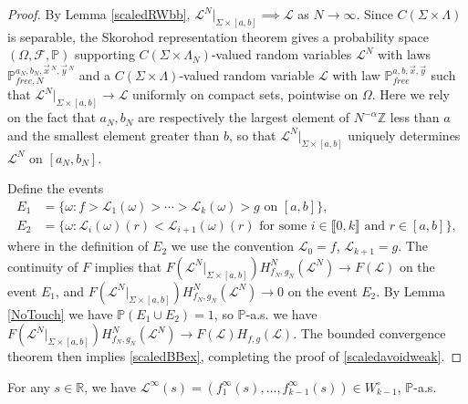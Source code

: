 \begin{proof}
	By Lemma \ref{scaledRWbb}, $\mathcal{L}^N|_{\Sigma\times[a,b]} \implies \mathcal{L}$ as $N\to\infty$. Since $C(\Sigma\times\Lambda)$ is separable, the Skorohod representation theorem \cite[Theorem 6.7]{Billing} gives a probability space $(\Omega,\mathcal{F},\mathbb{P})$ supporting $C(\Sigma\times\Lambda_N)$-valued random variables $\mathcal{L}^N$ with laws $\mathbb{P}^{a_N,b_N,\vec{x}\,^N,\vec{y}\,^N}_{free,N}$ and a $C(\Sigma\times\Lambda)$-valued random variable $\mathcal{L}$ with law $\mathbb{P}^{a,b,\vec{x},\vec{y}}_{free}$ such that $\mathcal{L}^N|_{\Sigma\times[a,b]}\to\mathcal{L}$ uniformly on compact sets, pointwise on $\Omega$. Here we rely on the fact that $a_N,b_N$ are respectively the largest element of $N^{-\alpha}\mathbb{Z}$ less than $a$ and the smallest element greater than $b$, so that $\mathcal{L}^N|_{\Sigma\times[a,b]}$ uniquely determines $\mathcal{L}^N$ on $[a_N,b_N]$.
	
	Define the events
	\begin{align*}
	E_1 &= \{\omega : f > \mathcal{L}_1(\omega) > \cdots > \mathcal{L}_k(\omega) > g \mbox{ on } [a,b]\},\\
	E_2 &= \{\omega : \mathcal{L}_i(\omega)(r) < \mathcal{L}_{i+1}(\omega)(r) \mbox{ for some } i\in\llbracket 0,k\rrbracket \mbox{ and } r\in[a,b]\},
	\end{align*}
	where in the definition of $E_2$ we use the convention $\mathcal{L}_0 = f$, $\mathcal{L}_{k+1} = g$. The continuity of $F$ implies that $F(\mathcal{L}^N|_{\Sigma\times[a,b]})H^N_{f_N,g_N}(\mathcal{L}^N) \to F(\mathcal{L})$ on the event $E_1$, and $F(\mathcal{L}^N|_{\Sigma\times[a,b]})H^N_{f_N,g_N}(\mathcal{L}^N)\to 0$ on the event $E_2$. By Lemma \ref{NoTouch} we have $\mathbb{P}(E_1 \cup E_2) = 1$, so $\mathbb{P}$-a.s. we have $F(\mathcal{L}^N|_{\Sigma\times[a,b]})H^N_{f_N,g_N}(\mathcal{L}^N) \to F(\mathcal{L})H_{f,g}(\mathcal{L})$. The bounded convergence theorem then implies \eqref{scaledBBex}, completing the proof of \eqref{scaledavoidweak}.
\end{proof}

\begin{lemma}\label{inftydistinct}
	For any $s\in\mathbb{R}$, we have $\mathcal{L}^\infty(s) = (f_1^\infty(s),\dots,f_{k-1}^\infty(s)) \in W^\circ_{k-1}$, $\mathbb{P}$-a.s.
\end{lemma}

